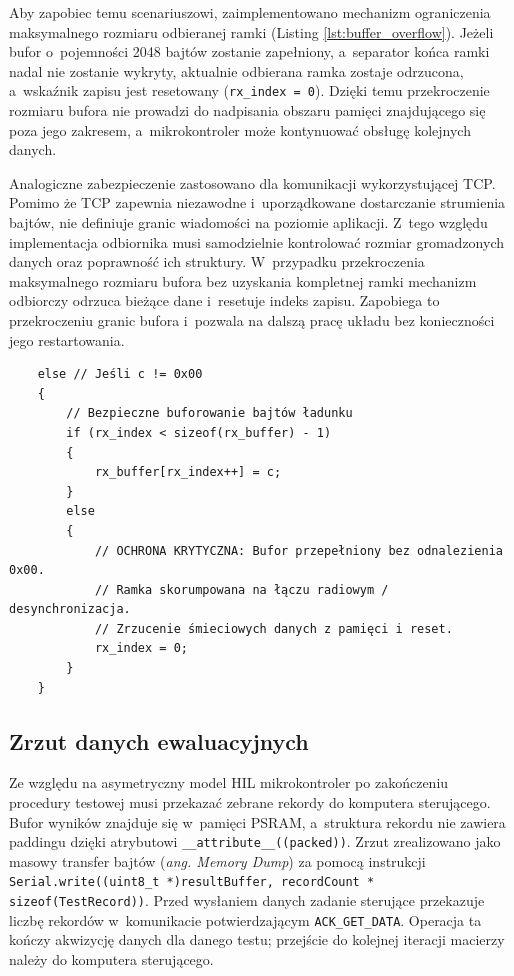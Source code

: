 Aby zapobiec temu scenariuszowi, zaimplementowano mechanizm ograniczenia maksymalnego rozmiaru odbieranej ramki (Listing \ref{lst:buffer_overflow}).
Jeżeli bufor o~pojemności 2048 bajtów zostanie zapełniony, a~separator końca ramki nadal nie zostanie wykryty, aktualnie odbierana ramka zostaje odrzucona, a~wskaźnik zapisu jest resetowany (\texttt{rx\_index = 0}).
Dzięki temu przekroczenie rozmiaru bufora nie prowadzi do nadpisania obszaru pamięci znajdującego się poza jego zakresem, a~mikrokontroler może kontynuować obsługę kolejnych danych.

Analogiczne zabezpieczenie zastosowano dla komunikacji wykorzystującej TCP.
Pomimo że TCP zapewnia niezawodne i~uporządkowane dostarczanie strumienia bajtów, nie definiuje granic wiadomości na poziomie aplikacji.
Z~tego względu implementacja odbiornika musi samodzielnie kontrolować rozmiar gromadzonych danych oraz poprawność ich struktury.
W~przypadku przekroczenia maksymalnego rozmiaru bufora bez uzyskania kompletnej ramki mechanizm odbiorczy odrzuca bieżące dane i~resetuje indeks zapisu.
Zapobiega to przekroczeniu granic bufora i~pozwala na dalszą pracę układu bez konieczności jego restartowania.

\begin{listing}[htbp]
    \caption{Mechanizm obronny przed przepełnieniem bufora strumieniowego i~desynchronizacją (\texttt{SerialBinDataPlane.cpp}) \cite{espy_nexus_esp32_firmware}.}
    \label{lst:buffer_overflow}
    \begin{verbatim}
    else // Jeśli c != 0x00
    {
        // Bezpieczne buforowanie bajtów ładunku
        if (rx_index < sizeof(rx_buffer) - 1)
        {
            rx_buffer[rx_index++] = c;
        }
        else
        {
            // OCHRONA KRYTYCZNA: Bufor przepełniony bez odnalezienia 0x00.
            // Ramka skorumpowana na łączu radiowym / desynchronizacja.
            // Zrzucenie śmieciowych danych z pamięci i reset.
            rx_index = 0;
        }
    }
\end{verbatim}
\end{listing}

\subsection{Zrzut danych ewaluacyjnych}
Ze względu na asymetryczny model HIL mikrokontroler po zakończeniu procedury testowej musi przekazać zebrane rekordy do komputera sterującego.
Bufor wyników znajduje się w~pamięci PSRAM, a~struktura rekordu nie zawiera paddingu dzięki atrybutowi \texttt{\_\_attribute\_\_((packed))}. Zrzut zrealizowano jako masowy transfer bajtów (\textit{ang. Memory Dump}) za pomocą instrukcji \texttt{Serial.write((uint8\_t *)resultBuffer, recordCount * sizeof(TestRecord))}.
Przed wysłaniem danych zadanie sterujące przekazuje liczbę rekordów w~komunikacie potwierdzającym \texttt{ACK\_GET\_DATA}. Operacja ta kończy akwizycję danych dla danego testu; przejście do kolejnej iteracji macierzy należy do komputera sterującego.
